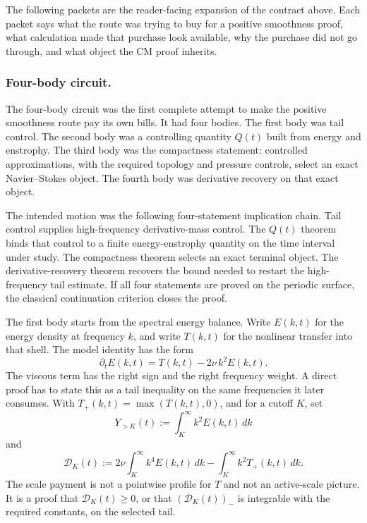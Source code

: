 The following packets are the reader-facing expansion of the contract above.
Each packet says what the route was trying to buy for a positive smoothness
proof, what calculation made that purchase look available, why the purchase
did not go through, and what object the CM proof inherits.

\subsubsection{Four-body circuit.}

The four-body circuit was the first complete attempt to make the positive
smoothness route pay its own bills.
It had four bodies.
The first body was tail control.
The second body was a controlling quantity \(Q(t)\) built from energy and
enstrophy.
The third body was the compactness statement: controlled approximations, with
the required topology and pressure controls, select an exact Navier--Stokes
object.
The fourth body was derivative recovery on that exact object.

The intended motion was the following four-statement implication chain.
Tail control supplies high-frequency derivative-mass control.
The \(Q(t)\) theorem binds that control to a finite energy-enstrophy quantity on
the time interval under study.
The compactness theorem selects an exact terminal object.
The derivative-recovery theorem recovers the bound needed to restart the
high-frequency tail estimate.
If all four statements are proved on the periodic surface, the classical
continuation criterion closes the proof.

The first body starts from the spectral energy balance.  Write \(E(k,t)\) for
the energy density at frequency \(k\), and write \(T(k,t)\) for the nonlinear
transfer into that shell.  The model identity has the form
\[
  \partial_t E(k,t)=T(k,t)-2\nu\,k^2E(k,t).
\]
The viscous term has the right sign and the right frequency weight.
A direct proof has to state this as a tail inequality on the same frequencies it
later consumes.  With \(T_+(k,t)=\max(T(k,t),0)\), and for a cutoff \(K\), set
\[
  Y_{>K}(t):=\int_K^\infty k^2E(k,t)\,dk
\]
and
\[
  \mathcal D_K(t)
  :=
  2\nu\int_K^\infty k^4E(k,t)\,dk
  -
  \int_K^\infty k^2T_+(k,t)\,dk .
\]
The scale payment is not a pointwise profile for \(T\) and not an active-scale
picture.  It is a proof that \(\mathcal D_K(t)\ge0\), or that
\((\mathcal D_K(t))_-\) is integrable with the required constants, on the
selected tail.

